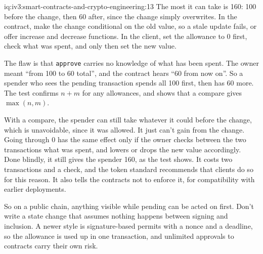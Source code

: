 \begin{solution}{iq:iv3:smart-contracts-and-crypto-engineering:13}
The most it can take is 160: 100 before the change, then 60 after, since the change simply overwrites. In the contract, make the change conditional on the old value, so a stale update fails, or offer increase and decrease functions. In the client, set the allowance to 0 first, check what was spent, and only then set the new value.
\label{lst:iv3:cr:approve}

The flaw is that \texttt{approve} carries no knowledge of what has been spent. The owner meant ``from 100 to 60 total'', and the contract hears ``60 from now on''. So a spender who sees the pending transaction spends all 100 first, then has 60 more. The test confirms $n + m$ for any allowances, and shows that a compare gives $\max(n, m)$.

With a compare, the spender can still take whatever it could before the change, which is unavoidable, since it was allowed. It just can't gain from the change. Going through 0 has the same effect only if the owner checks between the two transactions what was spent, and lowers or drops the new value accordingly. Done blindly, it still gives the spender 160, as the test shows. It costs two transactions and a check, and the token standard recommends that clients do so for this reason. It also tells the contracts not to enforce it, for compatibility with earlier deployments.

So on a public chain, anything visible while pending can be acted on first. Don't write a state change that assumes nothing happens between signing and inclusion. A newer style is signature-based permits with a nonce and a deadline, so the allowance is used up in one transaction, and unlimited approvals to contracts carry their own risk.

\end{solution}


